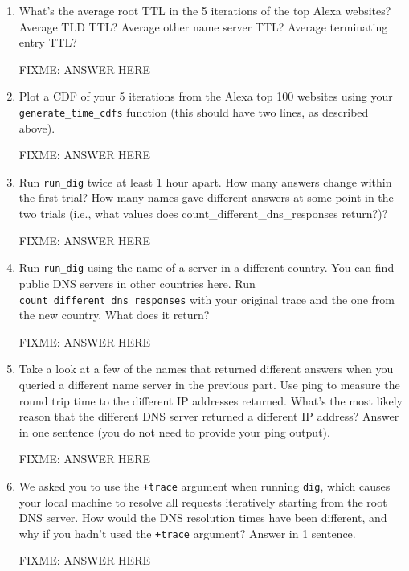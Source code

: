 \documentclass[10pt]{article}
\begin{document}
\begin{enumerate}

\item What's the average root TTL in the 5 iterations of the top Alexa websites? Average TLD TTL? Average other name server TTL? Average terminating entry TTL?

FIXME: ANSWER HERE

\item Plot a CDF of your 5 iterations from the Alexa top 100 websites using your \texttt{generate\_time\_cdfs} function (this should have two lines, as described above).

FIXME: ANSWER HERE

\item Run \texttt{run\_dig} twice at least 1 hour apart. How many answers change within the first trial? How many names gave different answers at some point in the two trials (i.e., what values does {count\_different\_dns\_responses} return?)?

FIXME: ANSWER HERE

\item Run \texttt{run\_dig} using the name of a server in a different country. You can find public DNS servers in other countries here. 
Run \texttt{count\_different\_dns\_responses} with your original trace and the one from the new country. What does it return?

FIXME: ANSWER HERE

\item Take a look at a few of the names that returned different answers when you queried a different name server in the previous part. Use ping to measure the round trip time to the different IP addresses returned. What's the most likely reason that the different DNS server returned a different IP address? Answer in one sentence (you do not need to provide your ping output).

FIXME: ANSWER HERE

\item We asked you to use the \texttt{+trace} argument when running \texttt{dig}, which causes your local machine to resolve all requests iteratively starting from the root DNS server. How would the DNS resolution times have been different, and why if you hadn't used the \texttt{+trace} argument? Answer in 1 sentence.

FIXME: ANSWER HERE

\end{enumerate}
\end{document}
